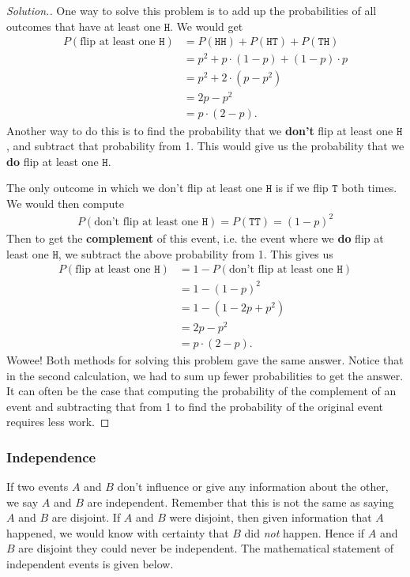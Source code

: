\documentclass[11pt,letterpaper]{article}
\newcommand\hd{\texttt{H}}
\newcommand\tl{\texttt{T}}
\numberwithin{theorem}{section}
\numberwithin{definition}{section}
\numberwithin{lemma}{section}
\numberwithin{corollary}{section}
\numberwithin{proposition}{section}
\theoremstyle{definition}
\numberwithin{remark}{section}
\numberwithin{claim}{section}
\numberwithin{observation}{section}
\numberwithin{fact}{section}
\numberwithin{assumption}{section}
\numberwithin{example}{section}
\numberwithin{exercise}{section}
\begin{document}
\begin{proof}[Solution.]
One way to solve this problem is to add up the probabilities of all outcomes that have at least one $\hd$. We would get
\begin{align*}
P(\text{flip at least one }\hd) &= P(\hd \hd) + P(\hd \tl) + P(\tl \hd) \\
&= p^2 + p \cdot (1-p) + (1-p) \cdot p \\
&= p^2 + 2 \cdot (p-p^2) \\
&= 2p - p^2 \\
&= p \cdot (2-p).
\end{align*}
Another way to do this is to find the probability that we \textbf{don't} flip at least one $\hd$, and subtract that probability from 1. This would give us the probability that we \textbf{do} flip at least one $\hd$. 

The only outcome in which we don't flip at least one $\hd$ is if we flip $\tl$ both times. We would then compute
\begin{align*}
P(\text{don't flip at least one }\hd) = P(\tl \tl) = (1-p)^2
\end{align*}
Then to get the \textbf{complement} of this event, i.e. the event where we \textbf{do} flip at least one $\hd$, we subtract the above probability from 1. This gives us
\begin{align*}
P(\text{flip at least one } \hd) &= 1 - P(\text{don't flip at least one }\hd) \\
&= 1 - (1-p)^2 \\
&= 1 - (1 - 2p + p^2) \\
&= 2p - p^2 \\
&= p\cdot (2 - p).
\end{align*}
Wowee! Both methods for solving this problem gave the same answer. Notice that in the second calculation, we had to sum up fewer probabilities to get the answer. It can often be the case that computing the probability of the complement of an event and subtracting that from 1 to find the probability of the original event requires less work. 
\end{proof}


\subsubsection{Independence}
If two events $A$ and $B$ don't influence or give any information about the other, we say $A$ and $B$ are independent. Remember that this is not the same as saying $A$ and $B$ are disjoint. If $A$ and $B$ were disjoint, then given information that $A$ happened, we would know with certainty that $B$ did \textit{not} happen. Hence if $A$ and $B$ are disjoint they could never be independent. The mathematical statement of independent events is given below.
\end{document}
